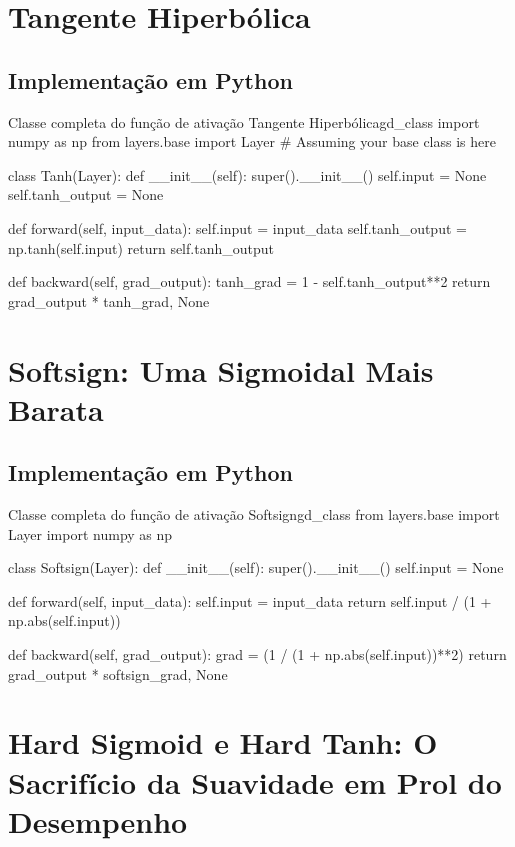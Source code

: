 \section{Tangente Hiperbólica}

\subsection{Implementação em Python}

\begin{codelisting}{Classe completa do função de ativação Tangente Hiperbólica}{gd_class}
import numpy as np
from layers.base import Layer  # Assuming your base class is here

class Tanh(Layer):
    def __init__(self):
        super().__init__()
        self.input = None
        self.tanh_output = None

    def forward(self, input_data):
        self.input = input_data
        self.tanh_output = np.tanh(self.input)
        return self.tanh_output

    def backward(self, grad_output):
        tanh_grad = 1 - self.tanh_output**2
        return grad_output * tanh_grad, None
\end{codelisting}

\section{Softsign: Uma Sigmoidal Mais Barata}

\subsection{Implementação em Python}

\begin{codelisting}{Classe completa do função de ativação Softsign}{gd_class}
from layers.base import Layer
import numpy as np

class Softsign(Layer):
    def __init__(self):
        super().__init__()
        self.input = None

    def forward(self, input_data):
        self.input = input_data
        return self.input / (1 + np.abs(self.input))

    def backward(self, grad_output):
        grad =  (1 / (1 + np.abs(self.input))**2)
        return grad_output * softsign_grad, None
\end{codelisting}

\section{Hard Sigmoid e Hard Tanh: O Sacrifício da Suavidade em Prol do Desempenho}

